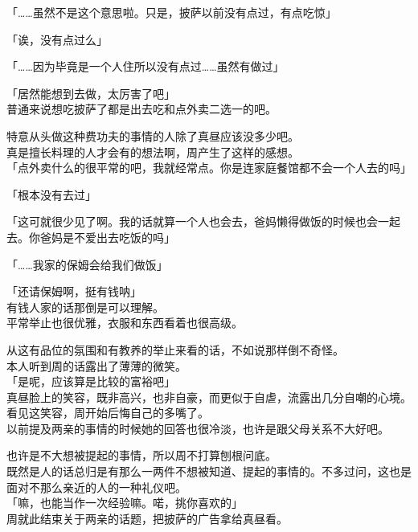 「……虽然不是这个意思啦。只是，披萨以前没有点过，有点吃惊」

「诶，没有点过么」

「……因为毕竟是一个人住所以没有点过……虽然有做过」

「居然能想到去做，太厉害了吧」\\

普通来说想吃披萨了都是出去吃和点外卖二选一的吧。

特意从头做这种费功夫的事情的人除了真昼应该没多少吧。\\

真是擅长料理的人才会有的想法啊，周产生了这样的感想。\\

「点外卖什么的很平常的吧，我就经常点。你是连家庭餐馆都不会一个人去的吗」

「根本没有去过」

「这可就很少见了啊。我的话就算一个人也会去，爸妈懒得做饭的时候也会一起去。你爸妈是不爱出去吃饭的吗」

「……我家的保姆会给我们做饭」

「还请保姆啊，挺有钱呐」\\

有钱人家的话那倒是可以理解。\\

平常举止也很优雅，衣服和东西看着也很高级。

从这有品位的氛围和有教养的举止来看的话，不如说那样倒不奇怪。\\

本人听到周的话露出了薄薄的微笑。\\

「是呢，应该算是比较的富裕吧」\\

真昼脸上的笑容，既非高兴，也非自豪，而更似于自虐，流露出几分自嘲的心境。看见这笑容，周开始后悔自己的多嘴了。\\

以前提及两亲的事情的时候她的回答也很冷淡，也许是跟父母关系不大好吧。

也许是不大想被提起的事情，所以周不打算刨根问底。\\

既然是人的话总归是有那么一两件不想被知道、提起的事情的。不多过问，这也是面对不那么亲近的人的一种礼仪吧。\\

「嘛，也能当作一次经验嘛。喏，挑你喜欢的」\\

周就此结束关于两亲的话题，把披萨的广告拿给真昼看。\\

